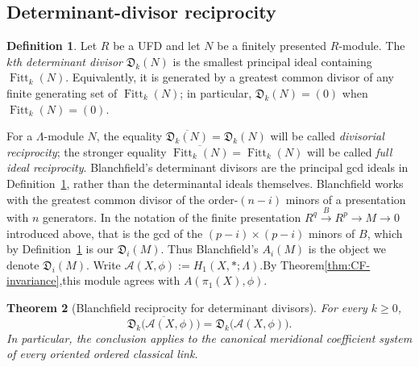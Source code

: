 \documentclass{article}
\theoremstyle{definition}
\newtheorem{definition}{Definition}[section]
\theoremstyle{plain}
\newtheorem{theorem}[definition]{Theorem}
\newcommand{\Fitt}{\operatorname{Fitt}}
\begin{document}
\subsection{Determinant-divisor reciprocity}
\label{subsec:determinant-reciprocity}

\begin{definition}\label{def:determinant-divisor}
Let \(R\) be a UFD and let \(N\) be a finitely presented \(R\)-module.
The \emph{\(k\)th determinant divisor} \(\mathfrak D_k(N)\) is the smallest
principal ideal containing \(\Fitt_k(N)\).  Equivalently, it is generated
by a greatest common divisor of any finite generating set of
\(\Fitt_k(N)\); in particular, \(\mathfrak D_k(N)=(0)\) when
\(\Fitt_k(N)=(0)\).
\end{definition}

For a \(\Lambda\)-module \(N\), the equality
\(\overline{\mathfrak D_k(N)}=\mathfrak D_k(N)\) will be called
\emph{divisorial reciprocity}; the stronger equality
\(\overline{\Fitt_k(N)}=\Fitt_k(N)\) will be called
\emph{full ideal reciprocity}.  Blanchfield's determinant divisors are the
principal gcd ideals in Definition~\ref{def:determinant-divisor}, rather
than the determinantal ideals themselves.  Blanchfield works with the
greatest common divisor of the order-\((n-i)\) minors of a presentation with
\(n\) generators.  In the notation of the finite presentation
\(R^{q}\xrightarrow{\,B\,}R^{p}\to M\to0\) introduced above, that is the gcd
of the \((p-i)\times(p-i)\) minors of \(B\), which by
Definition~\ref{def:determinant-divisor} is our \(\mathfrak D_i(M)\).  Thus
Blanchfield's \(A_i(M)\) is the object we denote \(\mathfrak D_i(M)\).
Write \(\mathcal A(X,\phi):=H_1(X,*;\Lambda)\).By Theorem\ref{thm:CF-invariance},this module agrees with  $A(\pi_1(X),\phi).$

\begin{theorem}[Blanchfield reciprocity for determinant divisors]
\label{thm:determinant-reciprocity}
For every \(k\ge0\),
\[
 \overline{\mathfrak D_k\bigl(\mathcal A(X,\phi)\bigr)}
 =\mathfrak D_k\bigl(\mathcal A(X,\phi)\bigr).
\]
In particular, the conclusion applies to the canonical meridional
coefficient system of every oriented ordered classical link.
\end{theorem}
\end{document}
